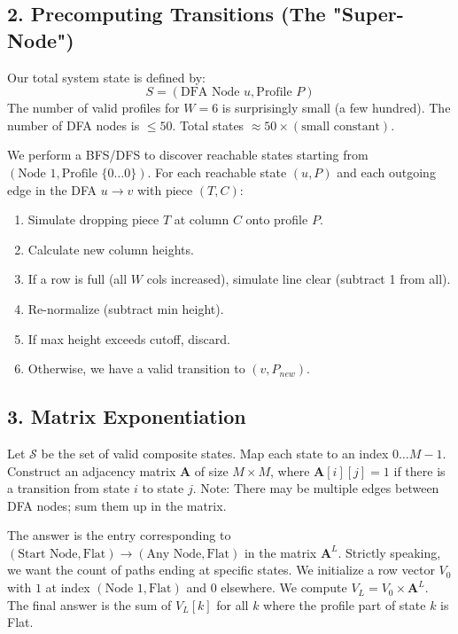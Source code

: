 \documentclass[11pt]{article}
\begin{document}
\subsection*{2. Precomputing Transitions (The "Super-Node")}
Our total system state is defined by:
$$ S = (\text{DFA Node } u, \text{Profile } P) $$
The number of valid profiles for $W=6$ is surprisingly small (a few hundred). The number of DFA nodes is $\le 50$.
Total states $\approx 50 \times (\text{small constant})$.

We perform a BFS/DFS to discover reachable states starting from $(\text{Node } 1, \text{Profile } \{0\dots0\})$.
For each reachable state $(u, P)$ and each outgoing edge in the DFA $u \to v$ with piece $(T, C)$:
\begin{enumerate}
    \item Simulate dropping piece $T$ at column $C$ onto profile $P$.
    \item Calculate new column heights.
    \item If a row is full (all $W$ cols increased), simulate line clear (subtract 1 from all).
    \item Re-normalize (subtract min height).
    \item If max height exceeds cutoff, discard.
    \item Otherwise, we have a valid transition to $(v, P_{new})$.
\end{enumerate}

\subsection*{3. Matrix Exponentiation}
Let $\mathcal{S}$ be the set of valid composite states. Map each state to an index $0 \dots M-1$.
Construct an adjacency matrix $\mathbf{A}$ of size $M \times M$, where $\mathbf{A}[i][j] = 1$ if there is a transition from state $i$ to state $j$.
Note: There may be multiple edges between DFA nodes; sum them up in the matrix.

The answer is the entry corresponding to $(\text{Start Node}, \text{Flat}) \to (\text{Any Node}, \text{Flat})$ in the matrix $\mathbf{A}^L$.
Strictly speaking, we want the count of paths ending at specific states.
We initialize a row vector $V_0$ with $1$ at index $(\text{Node } 1, \text{Flat})$ and $0$ elsewhere.
We compute $V_L = V_0 \times \mathbf{A}^L$.
The final answer is the sum of $V_L[k]$ for all $k$ where the profile part of state $k$ is Flat.
\end{document}
